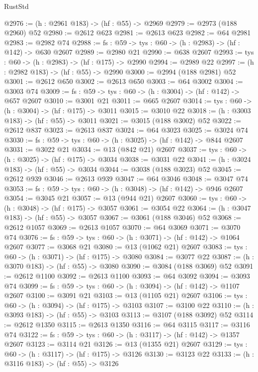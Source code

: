 \begin{lexlean}{RustStd}
\begin{coremodule}
@2976 := (h : @2961 @183) -> (hf : @55) -> @2969
@2979 := @2973 (@188 @2960) @52
@2980 := @2612 @623
@2981 := @2613 @623
@2982 := @64 @2981
@2983 := @2982 @74
@2988 := {fs : @59} -> {tys : @60} -> (h : @2983) -> (hf : @142) -> @630 @2607
@2989 := @2980 @21
@2990 := @638 @2607
@2993 := {tys : @60} -> (h : @2983) -> (hf : @175) -> @2990
@2994 := @2989 @22
@2997 := (h : @2982 @183) -> (hf : @55) -> @2990
@3000 := @2994 (@188 @2981) @52
@3001 := @2612 @650
@3002 := @2613 @650
@3003 := @64 @3002
@3004 := @3003 @74
@3009 := {fs : @59} -> {tys : @60} -> (h : @3004) -> (hf : @142) -> @657 @2607
@3010 := @3001 @21
@3011 := @665 @2607
@3014 := {tys : @60} -> (h : @3004) -> (hf : @175) -> @3011
@3015 := @3010 @22
@3018 := (h : @3003 @183) -> (hf : @55) -> @3011
@3021 := @3015 (@188 @3002) @52
@3022 := @2612 @837
@3023 := @2613 @837
@3024 := @64 @3023
@3025 := @3024 @74
@3030 := {fs : @59} -> {tys : @60} -> (h : @3025) -> (hf : @142) -> @844 @2607
@3031 := @3022 @21
@3034 := @13 (@842 @21) @2607
@3037 := {tys : @60} -> (h : @3025) -> (hf : @175) -> @3034
@3038 := @3031 @22
@3041 := (h : @3024 @183) -> (hf : @55) -> @3034
@3044 := @3038 (@188 @3023) @52
@3045 := @2612 @939
@3046 := @2613 @939
@3047 := @64 @3046
@3048 := @3047 @74
@3053 := {fs : @59} -> {tys : @60} -> (h : @3048) -> (hf : @142) -> @946 @2607
@3054 := @3045 @21
@3057 := @13 (@944 @21) @2607
@3060 := {tys : @60} -> (h : @3048) -> (hf : @175) -> @3057
@3061 := @3054 @22
@3064 := (h : @3047 @183) -> (hf : @55) -> @3057
@3067 := @3061 (@188 @3046) @52
@3068 := @2612 @1057
@3069 := @2613 @1057
@3070 := @64 @3069
@3071 := @3070 @74
@3076 := {fs : @59} -> {tys : @60} -> (h : @3071) -> (hf : @142) -> @1064 @2607
@3077 := @3068 @21
@3080 := @13 (@1062 @21) @2607
@3083 := {tys : @60} -> (h : @3071) -> (hf : @175) -> @3080
@3084 := @3077 @22
@3087 := (h : @3070 @183) -> (hf : @55) -> @3080
@3090 := @3084 (@188 @3069) @52
@3091 := @2612 @1100
@3092 := @2613 @1100
@3093 := @64 @3092
@3094 := @3093 @74
@3099 := {fs : @59} -> {tys : @60} -> (h : @3094) -> (hf : @142) -> @1107 @2607
@3100 := @3091 @21
@3103 := @13 (@1105 @21) @2607
@3106 := {tys : @60} -> (h : @3094) -> (hf : @175) -> @3103
@3107 := @3100 @22
@3110 := (h : @3093 @183) -> (hf : @55) -> @3103
@3113 := @3107 (@188 @3092) @52
@3114 := @2612 @1350
@3115 := @2613 @1350
@3116 := @64 @3115
@3117 := @3116 @74
@3122 := {fs : @59} -> {tys : @60} -> (h : @3117) -> (hf : @142) -> @1357 @2607
@3123 := @3114 @21
@3126 := @13 (@1355 @21) @2607
@3129 := {tys : @60} -> (h : @3117) -> (hf : @175) -> @3126
@3130 := @3123 @22
@3133 := (h : @3116 @183) -> (hf : @55) -> @3126

\end{coremodule}
\end{lexlean}
